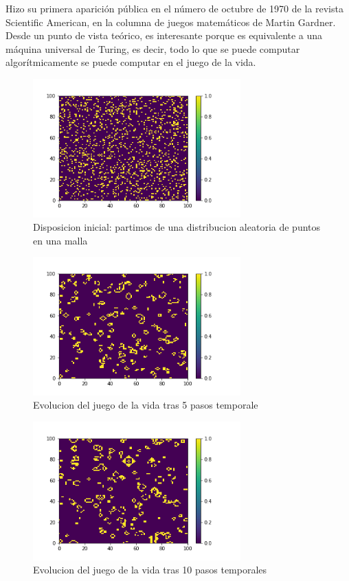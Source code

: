   Hizo su primera aparición pública en el número de octubre de 1970 de la revista Scientific American, en la columna de juegos matemáticos de Martin Gardner. Desde un punto de vista teórico, es interesante porque es equivalente a una máquina universal de Turing, es decir, todo lo que se puede computar algorítmicamente se puede computar en el juego de la vida.
    \begin{figure}
    	\centering
    	\includegraphics[width=8cm]{generation0}
    	\caption{Disposicion inicial: partimos de una distribucion aleatoria de puntos en una malla}
    	\label{gol1}
    \end{figure}
  \begin{figure}
  	\centering
  	\includegraphics[width=8cm]{generation5}
  	\caption{Evolucion del juego de la vida tras 5 pasos temporale}
  	\label{gol2}
  \end{figure}
  \begin{figure}
  	\centering
  	\includegraphics[width=8cm]{generation10}
  	\caption{Evolucion del juego de la vida tras 10 pasos temporales }
  	\label{gol3}
  \end{figure}
